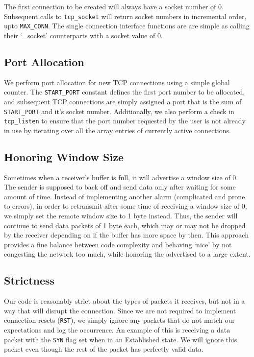 \documentclass{article}
\begin{document}
The first connection to be created will always have a socket number of 0. Subsequent calls to \texttt{tcp\_socket} will return socket numbers in incremental order, upto \texttt{MAX\_CONN}. The single connection interface functions are are simple as calling their `\_socket' counterparts with a socket value of 0.

\subsection{Port Allocation}
We perform port allocation for new TCP connections using a simple global counter. The \texttt{START\_PORT} constant defines the first port number to be allocated, and subsequent TCP connections are simply assigned a port that is the sum of \texttt{START\_PORT} and it's socket number. Additionally, we also perform a check in \texttt{tcp\_listen} to ensure that the port number requested by the user is not already in use by iterating over all the array entries of currently active connections.

\subsection{Honoring Window Size}
Sometimes when a receiver's buffer is full, it will advertise a window size of 0. The sender is supposed to back off and send data only after waiting for some amount of time. Instead of implementing another alarm (complicated and prone to errors), in order to retransmit after some time of receiving a window size of 0; we simply set the remote window size to 1 byte instead. Thus, the sender will continue to send data packets of 1 byte each, which may or may not be dropped by the receiver depending on if the buffer has more space by then. This approach provides a fine balance between code complexity and behaving `nice' by not congesting the network too much, while honoring the advertised to a large extent.

\subsection{Strictness}
Our code is reasonably strict about the types of packets it receives, but not in a way that will disrupt the connection. Since we are not required to implement connection resets (\texttt{RST}), we simply ignore any packets that do not match our expectations and log the occurrence. An example of this is receiving a data packet with the \texttt{SYN} flag set when in an Established state. We will ignore this packet even though the rest of the packet has perfectly valid data.
\end{document}
